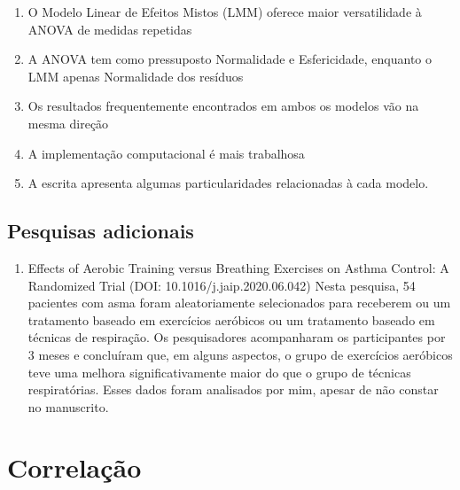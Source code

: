 \documentclass[
]{book}
\providecommand{\tightlist}{%
  \setlength{\itemsep}{0pt}\setlength{\parskip}{0pt}}
\begin{document}
\begin{explore}

\begin{enumerate}
\def\labelenumi{\arabic{enumi}.}
\tightlist
\item
  O Modelo Linear de Efeitos Mistos (LMM) oferece maior versatilidade à ANOVA de medidas repetidas\\
\item
  A ANOVA tem como pressuposto Normalidade e Esfericidade, enquanto o LMM apenas Normalidade dos resíduos
\item
  Os resultados frequentemente encontrados em ambos os modelos vão na mesma direção\\
\item
  A implementação computacional é mais trabalhosa\\
\item
  A escrita apresenta algumas particularidades relacionadas à cada modelo.\\
\end{enumerate}

\end{explore}

\hypertarget{pesquisas-adicionais-4}{%
\section{Pesquisas adicionais}\label{pesquisas-adicionais-4}}

\begin{enumerate}
\def\labelenumi{\arabic{enumi}.}
\tightlist
\item
  Effects of Aerobic Training versus Breathing Exercises on Asthma Control: A Randomized Trial (DOI: 10.1016/j.jaip.2020.06.042)
  Nesta pesquisa, 54 pacientes com asma foram aleatoriamente selecionados para receberem ou um tratamento baseado em exercícios aeróbicos ou um tratamento baseado em técnicas de respiração. Os pesquisadores acompanharam os participantes por 3 meses e concluíram que, em alguns aspectos, o grupo de exercícios aeróbicos teve uma melhora significativamente maior do que o grupo de técnicas respiratórias. Esses dados foram analisados por mim, apesar de não constar no manuscrito.
\end{enumerate}

\hypertarget{correlauxe7uxe3o}{%
\chapter{Correlação}\label{correlauxe7uxe3o}}
\end{document}
